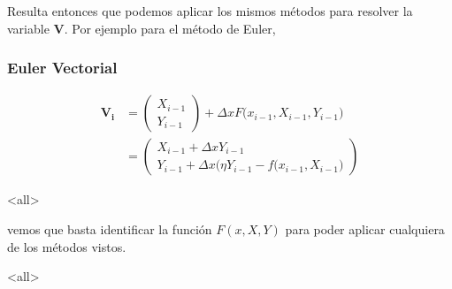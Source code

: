 Resulta entonces que podemos aplicar los mismos métodos para resolver la variable
$\mathbf{V}$. Por ejemplo para el método de Euler, 
\mode*
\begin{frame}[label=FrameEulerVectorial]
  \frametitle<presentation>{Euler Vectorial}
  \begin{equation}\label{EqnEulerVec}
    \begin{aligned}
      \mathbf{V_i} &= \begin{pmatrix} X_{i-1} \\ Y_{i-1} \end{pmatrix} + 
	\Delta x F\Big( x_{i-1}, X_{i-1}, Y_{i-1} \Big) \\
	{} &= 
	\begin{pmatrix} 
	  X_{i-1} + \Delta x Y_{i-1} \\ 
	  Y_{i-1} + \Delta x \Big( \eta Y_{i-1} - f(x_{i-1} , X_{i-1}\Big)
	\end{pmatrix}
    \end{aligned}
  \end{equation}
\end{frame}
\mode<all>

vemos que basta identificar la función $F(x, X, Y)$ para poder aplicar cualquiera de los métodos vistos.

\mode*

\mode<all>
